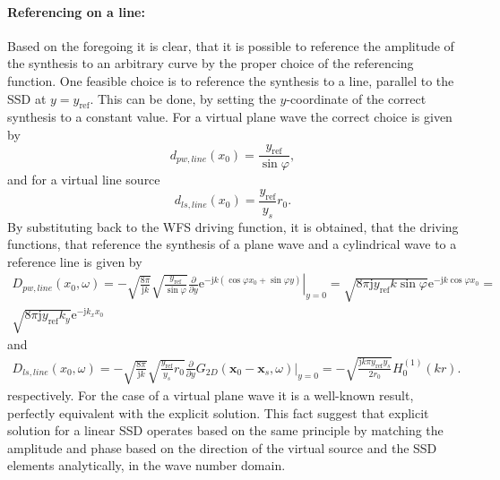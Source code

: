 \documentclass[12pt,a4paper]{article}
\newcommand{\te}{\mathrm{e}}
\newcommand{\ti}{\mathrm{j}}
\newcommand{\sinfi}{\sin\varphi}
\newcommand{\cosfi}{\cos\varphi}
\newcommand{\yref}{y_{\mathrm{ref}}}
\newcommand{\vxo}{\mathbf{x}_0}
\begin{document}
\paragraph{Referencing on a line:\\}
Based on the foregoing it is clear, that it is possible to reference the amplitude of the synthesis to an arbitrary curve by the proper choice of the referencing function. 
One feasible choice is to reference the synthesis to a line, parallel to the SSD at $y=\yref$. This can be done, by setting the $y$-coordinate of the correct synthesis to a constant value.
For a virtual plane wave the correct choice is given by
\begin{equation}
d_{pw,line}(x_0) = \frac{\yref}{\sinfi},
\end{equation}
and for a virtual line source 
\begin{equation}
d_{ls,line}(x_0) = \frac{\yref}{y_s} r_0.
\end{equation}
By substituting back to the WFS driving function, it is obtained, that the driving functions, that reference the synthesis of a plane wave and a cylindrical wave to a reference line is given by
\begin{multline}
D_{pw,line}(x_0,\omega) = 
- \sqrt{\frac{8\pi}{\ti k}}\sqrt{\frac{\yref}{\sinfi}} \frac{\partial}{\partial y} \left. \te^{-\ti k (\cosfi x_0 + \sinfi y)} \right|_{y = 0} = 
\sqrt{8\pi \ti \yref k \sinfi}\te^{-\ti k \cosfi x_0 } =\\ 
\sqrt{8\pi \ti \yref k_y }\te^{-\ti k_x x_0 }
\end{multline}
and
\begin{multline}
D_{ls,line}(x_0,\omega) = 
- \sqrt{\frac{8\pi}{\ti k}}\sqrt{\frac{\yref}{y_s} r_0} \frac{\partial}{\partial y} \left. G_{2D}(\vxo -  \mathbf{x}_s,\omega) \right|_{y = 0} =
- \sqrt{\frac{\ti k \pi \yref y_s}{2 r_0}}  H_0^{(1)}( k r ).
\end{multline}
respectively. For the case of a virtual plane wave it is a well-known result, perfectly equivalent with the explicit solution. 
This fact suggest that explicit solution for a linear SSD operates based on the same principle by matching the amplitude and phase based on the direction of the virtual source and the SSD elements analytically, in the wave number domain.
\end{document}
